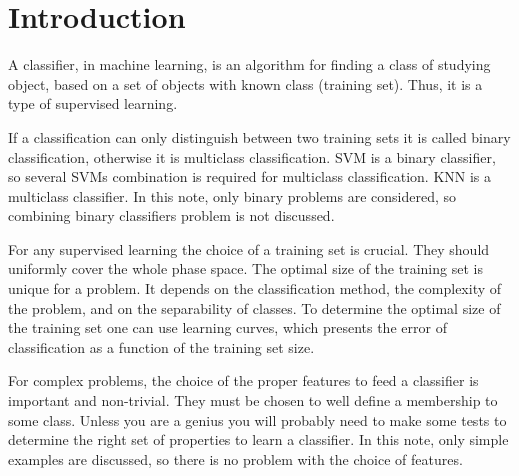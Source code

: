 \section{Introduction}
\label{sec: introduction}

A classifier, in machine learning, is an algorithm for finding a class of studying object, based on a set of objects with known class (training set). Thus, it is a type of supervised learning. 

If a classification can only distinguish between two training sets it is called binary classification, otherwise it is multiclass classification. SVM is a binary classifier, so several SVMs combination is required for multiclass classification. KNN is a multiclass classifier. In this note, only binary problems are considered, so combining binary classifiers problem is not discussed.

For any supervised learning the choice of a training set is crucial. They should uniformly cover the whole phase space. The optimal size of the training set is unique for a problem. It depends on the classification method, the complexity of the problem, and on the separability of classes. To determine the optimal size of the training set one can use learning curves, which presents the error of classification as a function of the training set size.

For complex problems, the choice of the proper features to feed a classifier is important and non-trivial. They must be chosen to well define a membership to some class. Unless you are a genius you will probably need to make some tests to determine the right set of properties to learn a classifier. In this note, only simple examples are discussed, so there is no problem with the choice of features.
